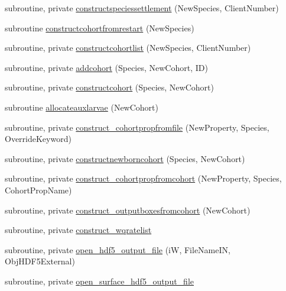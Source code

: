 \begin{DoxyCompactItemize}
\item 
subroutine, private \mbox{\hyperlink{namespacemodulewaterproperties_a3d2b79958b73c28e20d23afd2fe092ef}{constructspeciessettlement}} (New\+Species, Client\+Number)
\item 
subroutine \mbox{\hyperlink{namespacemodulewaterproperties_a1c0b4f7abb2ee1226f22838efe265c80}{constructcohortfromrestart}} (New\+Species)
\item 
subroutine, private \mbox{\hyperlink{namespacemodulewaterproperties_abc72b5ed3f87133ad8c1dfd787c6eee5}{constructcohortlist}} (New\+Species, Client\+Number)
\item 
subroutine, private \mbox{\hyperlink{namespacemodulewaterproperties_a2a206e94af2b9f46781896fdc7ccfb3a}{addcohort}} (Species, New\+Cohort, ID)
\item 
subroutine, private \mbox{\hyperlink{namespacemodulewaterproperties_ae8f037a58e95e5182b8c0d4b073ad271}{constructcohort}} (Species, New\+Cohort)
\item 
subroutine \mbox{\hyperlink{namespacemodulewaterproperties_a7cc00cb7efcee6190d254a8eb846064c}{allocateauxlarvae}} (New\+Cohort)
\item 
subroutine, private \mbox{\hyperlink{namespacemodulewaterproperties_ad9060a1bd0766835e26c1961f52d84a0}{construct\+\_\+cohortpropfromfile}} (New\+Property, Species, Override\+Keyword)
\item 
subroutine, private \mbox{\hyperlink{namespacemodulewaterproperties_a6d6a2e31ca36bd79bebb89f3613ed278}{constructnewborncohort}} (Species, New\+Cohort)
\item 
subroutine, private \mbox{\hyperlink{namespacemodulewaterproperties_ae1c5c0deae03ce719a2b777bc86fb00f}{construct\+\_\+cohortpropfromcohort}} (New\+Property, Species, Cohort\+Prop\+Name)
\item 
subroutine, private \mbox{\hyperlink{namespacemodulewaterproperties_a6f39106e418f143aa0c8fc86f0756562}{construct\+\_\+outputboxesfromcohort}} (New\+Cohort)
\item 
subroutine, private \mbox{\hyperlink{namespacemodulewaterproperties_abadbafe8dee3212a744771417b0c292a}{construct\+\_\+wqratelist}}
\item 
subroutine, private \mbox{\hyperlink{namespacemodulewaterproperties_a20976aef3db724e8f1b9ec39453b5a98}{open\+\_\+hdf5\+\_\+output\+\_\+file}} (iW, File\+Name\+IN, Obj\+H\+D\+F5\+External)
\item 
subroutine, private \mbox{\hyperlink{namespacemodulewaterproperties_a947e6ba82bfc1266159800996b8e073c}{open\+\_\+surface\+\_\+hdf5\+\_\+output\+\_\+file}}

\end{DoxyCompactItemize}
